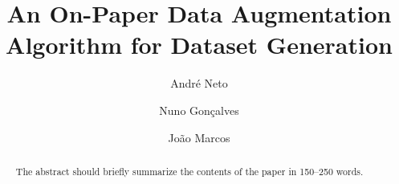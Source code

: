\documentclass[runningheads]{llncs}
\begin{document}
\title{An On-Paper Data Augmentation Algorithm for Dataset Generation}

\author{André Neto \and %
Nuno Gonçalves \and %
João Marcos} %
%
%
%
\maketitle              %
%
\begin{abstract}
The abstract should briefly summarize the contents of the paper in
150--250 words.

\end{abstract}





\end{document}
